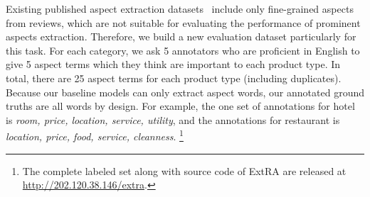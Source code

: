 Existing published aspect extraction datasets~\cite{hu2004mining,popescu2007extracting,pavlopoulos2014aspect,ding2008holistic} 
include only fine-grained aspects from reviews,
which are not suitable for evaluating the performance of 
prominent aspects extraction. 
Therefore, we build a new evaluation dataset particularly 
for this task.
For each category, we ask 5 annotators who are proficient in English 
to give 5 aspect terms which they think are important to each product type.
In total, there are 25 aspect terms
for each product type (including duplicates).
Because our baseline models can only extract aspect words,
our annotated ground truths are all words by design.
For example, the one set of annotations for hotel is 
{\em room, price, location, service, utility}, and the annotations
for restaurant is
{\em location, price, food, service, cleanness}. \footnote{The 
complete labeled set along with source code of ExtRA are released at \url{http://202.120.38.146/extra}.}

%		
%		



